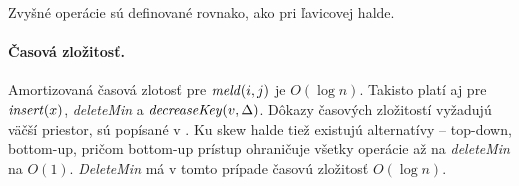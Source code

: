 Zvyšné operácie sú definované rovnako, ako pri ľavicovej halde.

\paragraph{Časová zložitosť.}
Amortizovaná časová zlotosť pre $\mathop{\mathit{meld}}(i,j)$ je $O(\log n)$.
Takisto platí aj pre $\mathop{\mathit{insert}}(x)$, \emph{deleteMin} a $\mathop{\mathit{decreaseKey}}(v,\Delta)$.
Dôkazy časových zložitostí vyžadujú väčší priestor, sú popísané v \cite{skew}.
Ku skew halde tiež existujú alternatívy -- top-down, bottom-up, pričom
bottom-up prístup ohraničuje všetky operácie až na \emph{deleteMin} na $O(1)$.
\emph{DeleteMin} má v tomto prípade časovú zložitosť $O(\log n)$.
